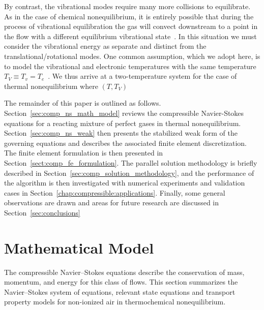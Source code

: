 By contrast, the vibrational modes require many more collisions to equilibrate.  As in the case of chemical nonequilibrium, it is entirely possible that during the process of vibrational equilibration the gas will convect downstream to a point in the flow with a different equilibrium vibrational state~\cite{anderson_hypersonic}.  In this situation we must consider the vibrational energy as separate and distinct from the translational/rotational modes.  One common assumption, which we adopt here, is to model the vibrational and electronic temperatures with the same temperature $T_V\equiv T_v=T_e$~\cite{gnoffo_conservation_laws}.  We thus arrive at a two-temperature system for the case of thermal nonequilibrium where $\left(T,T_V\right)$ 

The remainder of this paper is outlined as follows.  Section~\ref{sec:comp_ns_math_model} reviews the compressible Navier-Stokes equations for a reacting mixture of perfect gases in thermal nonequilibrium. Section~\ref{sec:comp_ns_weak} then presents the stabilized weak form of the governing equations and describes the associated finite element discretization.  The finite element formulation is then presented in Section~\ref{sect:comp_fe_formulation}.  The parallel solution methodology is briefly  described in Section~\ref{sec:comp_solution_methodology}, and the performance of the algorithm is then investigated with numerical experiments and validation cases in Section~\ref{chap:compressible:applications}.  Finally, some general observations are drawn and areas for future research are discussed in Section~\ref{sec:conclusions}


\section{Mathematical Model\label{sec:comp_ns_math_model}}
The compressible Navier--Stokes equations describe the conservation of mass, momentum, and energy for this class of flows.  This section summarizes the Navier--Stokes system of equations, relevant state equations and transport property models for non-ionized air in thermochemical nonequilibrium.

